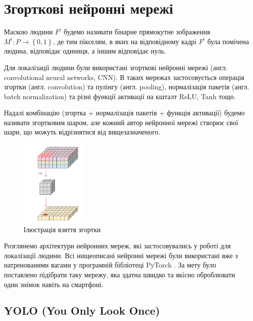\section{Згорткові нейронні мережі}

\begin{definition}
    Маскою людини \(F^{i}\) будемо називати бінарне прямокутне
зображення \(M^{i}:P \rightarrow \left\{ 0,1 \right\}\), де тим
пікселям, в яких на відповідному кадрі \(F^{i}\) була помічена людина,
відповідає одиниця, а іншим відповідає нуль.
\end{definition}
Для локалізації людини були використані згорткові нейронні мережі 
(англ. convolutional neural networks, CNN).
В таких мережах застосовується операція згортки (англ. convolution)
та пулінгу (англ. pooling), нормалізація пакетів (англ. batch normalization)
та різні функції активації на кшталт ReLU, Tanh тощо.

Надалі комбінацію (згортка + нормалізація пакетів + функція активації)
будемо називати згортковим шаром, але кожний автор нейронної мережі
створює свої шари, що можуть відрізнятися від вищезазначеного.

\begin{figure}[H]
    \centering
    \includegraphics[width=0.3\textwidth]{images/cnn_conv_operation}
    \caption{Ілюстрація взяття згортки  \cite{deep_wise_sep_conv_website}
        \label{fig:cnn:conv_operation}
    }
\end{figure}

Розглянемо архітектури нейронних мереж, які застосовувались у роботі
для локалізації людини. Всі нищеописані нейронні мережі були використані вже з
натренованими вагами у програмній бібліотеці PyTorch \cite{pytorch_library}.
За мету було поставлено підібрати таку мережу, яка здатна швидко та якісно оброблювати
один знімок навіть на смартфоні.

\subsection{YOLO (You Only Look Once)}

